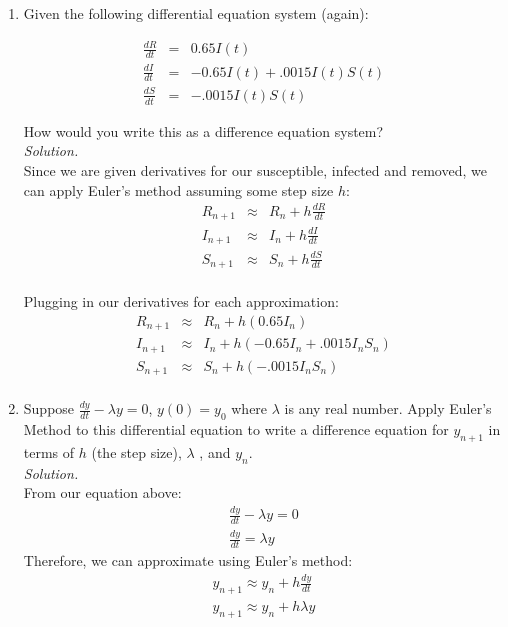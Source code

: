 \documentclass[12pt,letterpaper]{article}
\begin{document}
\begin{enumerate}
\item Given the following differential equation system (again):

\begin{eqnarray*}
\frac{dR}{dt} &=& 0.65I(t)\\
\frac{dI}{dt}&=& -0.65I(t)+.0015I(t)S(t)\\
\frac{dS}{dt}&=& -.0015I(t)S(t)
\end{eqnarray*}

How would you write this as a difference equation system? \\
\emph{Solution.}\\
Since we are given derivatives for our susceptible, infected and removed, we can apply 
Euler's method assuming some step size $h$: 
\begin{eqnarray*}
  R_{n+1} &\approx& R_{n} + h\frac{dR}{dt}\\
  I_{n+1} &\approx& I_{n} + h\frac{dI}{dt}\\
  S_{n+1} &\approx& S_{n} + h\frac{dS}{dt}\\
\end{eqnarray*}

Plugging in our derivatives for each approximation: 
\begin{eqnarray*}
  R_{n+1} &\approx& R_{n} + h(0.65I_{n})\\
  I_{n+1} &\approx& I_{n} + h(-0.65I_{n}+.0015I_{n}S_{n})\\
  S_{n+1} &\approx& S_{n} + h(-.0015I_{n}S_{n})\\
\end{eqnarray*}

\item 
Suppose $\frac{dy}{dt} - \lambda y=0$, $ y(0)=y_0$ where $\lambda$ is any real number. Apply Euler's Method to this differential equation to write a difference equation for $y_{n+1}$ in terms of $h$ (the step size), $\lambda$ , and $y_{n}$.
\\
\emph{Solution.} \\
From our equation above: 
\begin{gather*}
  \frac{dy}{dt} - \lambda y = 0 \\
  \frac{dy}{dt} = \lambda y
\end{gather*}
Therefore, we can approximate using Euler's method: 
\begin{gather*}
  y_{n+1} \approx y_{n} + h\frac{dy}{dt}\\
  y_{n+1} \approx y_{n} + h\lambda y
\end{gather*}


\end{enumerate}
\end{document}
